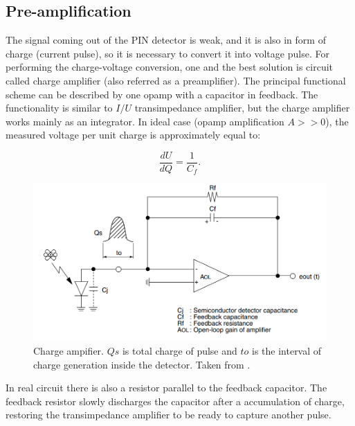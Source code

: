 \subsection{Pre-amplification}
The signal coming out of the PIN detector is weak, and it is also in form of charge (current pulse), so it is necessary to convert it into voltage pulse. For performing the charge-voltage conversion, one and the best solution is circuit called charge amplifier (also referred as a preamplifier). The principal functional scheme can be described by one opamp with a capacitor in feedback. The functionality is similar to $I/U$ transimpedance amplifier, but the charge amplifier works mainly as an integrator. In ideal case (opamp amplification $A >> 0$), the measured voltage per unit charge is approximately equal to:

\begin{equation}
\frac{dU}{dQ} = \frac{1}{C_{f}}.
\end{equation}


\begin{figure}[H]
 \centering
 \includegraphics[scale=0.4, angle = 0]{./pictures/champlifier.png}
 \caption{Charge ampifier. $Qs$ is total charge of pulse and $to$ is the interval of charge generation inside the detector. Taken from \cite{charge}.}
 \label{trans}
 
\end{figure}



\par
In real circuit there is also a resistor parallel to the feedback capacitor. The feedback resistor slowly discharges the capacitor after a accumulation of charge, restoring the transimpedance amplifier to be ready to capture another pulse.

